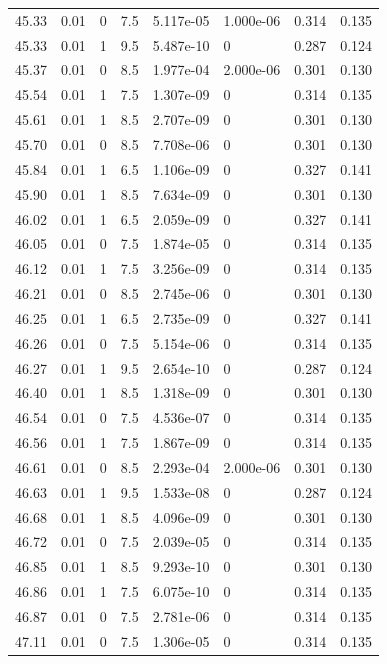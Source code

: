 \documentclass[preview]{standalone}
\begin{document}
{{{{{{{{{{{{{\begin{tabular}{L{1.2cm}C{1.2cm} C{0.3cm}C{0.5cm} C{1.4cm}C{1.4cm} C{1.4cm}C{1.4cm}}
  45.33  &  0.01  & 0     & 7.5 &  5.117e-05  & 1.000e-06  & 0.314 &  0.135   \\ 
  45.33  &  0.01  & 1     & 9.5 &  5.487e-10  & 0  & 0.287 &  0.124   \\ 
  45.37  &  0.01  & 0     & 8.5 &  1.977e-04  & 2.000e-06  & 0.301 &  0.130   \\ 
  45.54  &  0.01  & 1     & 7.5 &  1.307e-09  & 0  & 0.314 &  0.135   \\ 
  45.61  &  0.01  & 1     & 8.5 &  2.707e-09  & 0  & 0.301 &  0.130   \\ 
  45.70  &  0.01  & 0     & 8.5 &  7.708e-06  & 0  & 0.301 &  0.130   \\ 
  45.84  &  0.01  & 1     & 6.5 &  1.106e-09  & 0  & 0.327 &  0.141   \\ 
  45.90  &  0.01  & 1     & 8.5 &  7.634e-09  & 0  & 0.301 &  0.130   \\ 
  46.02  &  0.01  & 1     & 6.5 &  2.059e-09  & 0  & 0.327 &  0.141   \\ 
  46.05  &  0.01  & 0     & 7.5 &  1.874e-05  & 0  & 0.314 &  0.135   \\ 
  46.12  &  0.01  & 1     & 7.5 &  3.256e-09  & 0  & 0.314 &  0.135   \\ 
  46.21  &  0.01  & 0     & 8.5 &  2.745e-06  & 0  & 0.301 &  0.130   \\ 
  46.25  &  0.01  & 1     & 6.5 &  2.735e-09  & 0  & 0.327 &  0.141   \\ 
  46.26  &  0.01  & 0     & 7.5 &  5.154e-06  & 0  & 0.314 &  0.135   \\ 
  46.27  &  0.01  & 1     & 9.5 &  2.654e-10  & 0  & 0.287 &  0.124   \\ 
  46.40  &  0.01  & 1     & 8.5 &  1.318e-09  & 0  & 0.301 &  0.130   \\ 
  46.54  &  0.01  & 0     & 7.5 &  4.536e-07  & 0  & 0.314 &  0.135   \\ 
  46.56  &  0.01  & 1     & 7.5 &  1.867e-09  & 0  & 0.314 &  0.135   \\ 
  46.61  &  0.01  & 0     & 8.5 &  2.293e-04  & 2.000e-06  & 0.301 &  0.130   \\ 
  46.63  &  0.01  & 1     & 9.5 &  1.533e-08  & 0  & 0.287 &  0.124   \\ 
  46.68  &  0.01  & 1     & 8.5 &  4.096e-09  & 0  & 0.301 &  0.130   \\ 
  46.72  &  0.01  & 0     & 7.5 &  2.039e-05  & 0  & 0.314 &  0.135   \\ 
  46.85  &  0.01  & 1     & 8.5 &  9.293e-10  & 0  & 0.301 &  0.130   \\ 
  46.86  &  0.01  & 1     & 7.5 &  6.075e-10  & 0  & 0.314 &  0.135   \\ 
  46.87  &  0.01  & 0     & 7.5 &  2.781e-06  & 0  & 0.314 &  0.135   \\ 
  47.11  &  0.01  & 0     & 7.5 &  1.306e-05  & 0  & 0.314 &  0.135   \\ 
\hline 
\end{tabular} 

}}}}}}}}}}}}}
\end{document}
